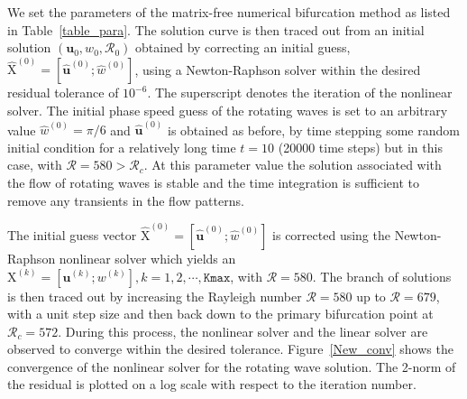 We set the parameters of the matrix-free numerical bifurcation method as listed in Table~\ref{table_para}. The solution curve is then traced out from an initial solution $(\mathbf{u}_0,w_0,\mathcal{R}_0)$ obtained by correcting an initial guess,
$\mathrm{\hat{X}}^{(0)} = [\mathbf{\hat{u}}^{(0)};\hat{w}^{(0)}]$,
using a Newton-Raphson solver within the desired residual tolerance of $10^{-6}$. The superscript denotes the iteration of the nonlinear solver. The initial phase speed guess of the rotating waves is set to an arbitrary value $\hat{w}^{(0)} = \pi/6$ and $\mathbf{\hat{u}}^{(0)}$ is obtained as before, by time stepping some random initial condition for a relatively long time $t = 10$ (20000 time steps) but in this case, with $\mathcal{R} = 580 > \mathcal{R}_c$. At this parameter value the solution associated with the flow of rotating waves is stable and the time integration is sufficient to remove any transients in the flow patterns.

The initial guess vector $\mathrm{\hat{X}}^{(0)} = [\mathbf{\hat{u}}^{(0)};\hat{w}^{(0)}]$ is corrected using the Newton-Raphson nonlinear solver which yields an $\mathrm{X}^{(k)} = [\mathbf{u}^{(k)};{w}^{(k)}], k = 1,2,\cdots,\texttt{Kmax}$, with $\mathcal{R} = 580$. The branch of solutions is then traced out by increasing the Rayleigh number $\mathcal{R} = 580$ up to $\mathcal{R} = 679$, with a unit step size  and then back down to the primary bifurcation point at $\mathcal{R}_c = 572$.
During this process, the nonlinear solver and the linear solver are observed to converge within the desired tolerance. Figure~\ref{New_conv} shows the convergence of the nonlinear solver for the rotating wave solution. The 2-norm of the residual is plotted on a log scale with respect to the iteration number.

